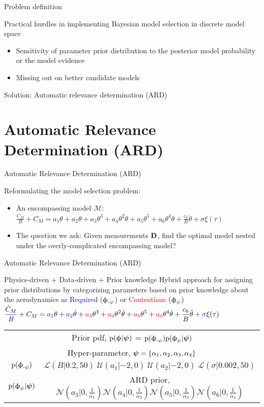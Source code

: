 \documentclass[xcolor=dvipsnames,10pt]{beamer}
\newcommand{\df}{\displaystyle\frac}
\newcommand{\U}{\mathcal{U}}
\def\bpsi{\mbox{\boldmath $\psi$}}
\newcommand{\cL}{\mathcal{L}}
\newcommand{\M}{\mathcal{M}}
\newcommand{\N}{\mathcal{N}}
\def\th{\ensuremath{\theta}}
\def\dth{\ensuremath{\dot{\theta}}}
\def\ddth{\ensuremath{\ddot{\theta}}}
\def\prob{\mbox{$\text{p}$}}
\def\bdn{\mbox{$\bD$}}
\def\bD{\mbox{\bf D}}
\def\bphi{\mbox{\ensuremath{\upphi}}}
\def\bphik{\ensuremath{\bphi_{\text{-}\psi}}}
\def\bphiu{\ensuremath{\bphi_{\psi}}}
\def\Cm{\ensuremath{\text{C}_{m}(\th)}}
\def\dCm{\mbox{$\dot{C}_{M}$}}
\def\Cm{\ensuremath{C_{M}}}
\newcommand{\alertb}[1]{\begin{center}\alert{#1}\end{center}}
\newcommand{\red}[1]{{\textcolor{red}{#1}}}
\newcommand{\blue}[1]{{\textcolor{blue}{#1}}}
\newenvironment{newblockc}[1]
{\begin{block}{#1}\begin{itemize}\small
  \setlength{\itemsep}{4pt}}
{\end{itemize}\end{block}}
\newcommand{\itb}[1]{\item #1}
\newcommand{\newblockb}[2]{\begin{block}{#1} \small #2 \end{block}}
\begin{document}
\begin{frame}{Problem definition}
\begin{newblockc}{Practical hurdles in implementing Bayesian model selection in discrete model space}
\itb{Sensitivity of parameter prior distribution to the posterior model probability or the model evidence}
\itb{Missing out on better candidate models}
\end{newblockc}
\alertb{Solution: Automatic relevance determination (ARD)}
\end{frame}

\section{Automatic Relevance Determination (ARD)}


\begin{frame}{Automatic Relevance Determination (ARD)}
\begin{newblockc}{Reformulating  the model selection problem:}
\itb{An encompassing model $\M$:\\[0.1in]  $\df{\dCm}{B} + \Cm = a_1 \th + a_2 \dth + a_3 \th^3 + a_4 \th^2 \dth +  a_5 \th^5 +  a_6 \th^4 \dth  + \df{c_6}{B} \ddth  + \sigma \xi(\tau)$}
\itb{The question we ask: Given measurements $\bdn$, find the optimal model nested under the overly-complicated encompassing model?}
\end{newblockc}
\end{frame}


\begin{frame}{Automatic Relevance Determination (ARD)}
\newblockb{Physics-driven + Data-driven + Prior knowledge}{Hybrid approach for assigning prior distributions by categorizing parameters based on prior knowledge about the aerodynamics as \blue{Required} (\bphik) or \red{Contentious} (\bphiu)\\ 
$\df{\dCm}{\blue{B}} + \Cm = \blue{a_1} \th + \blue{a_2} \dth + \red{a_3} \th^3 + \red{a_4} \th^2 \dth +  \red{a_5} \th^5 +  \red{a_6} \th^4 \dth  + \df{c_6}{B} \ddth  + \blue{\sigma} \xi(\tau)$}
\vspace{0.1in}
{
\renewcommand{\arraystretch}{2.0}
\begin{table}[!htbp]
\small
\centering
\begin{tabular}{|c||c|}
\hline
\multicolumn{2}{|c|}{Prior pdf, $\prob(\bphi|\bpsi)$ = $\prob(\bphik)\prob(\bphiu|\bpsi)$} \\
\multicolumn{2}{|c|}{Hyper-parameter, $\bpsi = \{\alpha_1, \alpha_2, \alpha_3, \alpha_4\}$ } \\ \hline
\blue{$\prob(\bphik)$} &  $ \cL(B|0.2, 50) \; \U(a_1| {-2},0) \; \U(a_2| {-2},0) \; \cL(\sigma |0.002,50) $  \\
\red{$\prob(\bphiu|\bpsi)$} & ARD prior, $\N\left(a_3|0,\frac{1}{\alpha_1}\right)\N\left(a_4|0,\frac{1}{\alpha_2}\right)\N\left(a_5|0,\frac{1}{\alpha_3}\right)\N\left(a_6|0,\frac{1}{\alpha_4}\right)$   \\ \hline 
\end{tabular}
\label{tab:t3}
\end{table}
}
\end{frame}
\end{document}
